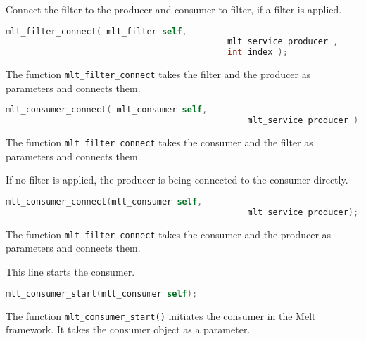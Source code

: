 \documentclass[../MasterThesis.tex]{subfiles}
\begin{document}
\begin{description}[font=\normalfont\color{RedViolet!80!black}, style=nextline]
	Connect the filter to the producer and consumer to filter, if a filter is applied.
	
	\begin{lstlisting}[language=C, numbers=none, basicstyle=\footnotesize\ttfamily, belowskip=0pt, aboveskip=9pt]
	mlt_filter_connect( mlt_filter self, 
											mlt_service producer , 
											int index ); \end{lstlisting}

	The function \texttt{mlt\_filter\_connect} takes the filter and the producer as parameters and connects them.
	
	\begin{lstlisting}[language=C, numbers=none, basicstyle=\footnotesize\ttfamily, belowskip=0pt, aboveskip=9pt]
	mlt_consumer_connect( mlt_consumer self, 
												mlt_service producer ); \end{lstlisting}

	The function \texttt{mlt\_filter\_connect} takes the consumer and the filter as parameters and connects them.
	
	
	If no filter is applied, the producer is being connected to the consumer directly.
	
	\begin{lstlisting}[language=C, numbers=none, basicstyle=\footnotesize\ttfamily, belowskip=0pt, aboveskip=9pt]
	mlt_consumer_connect(mlt_consumer self, 
												mlt_service producer); \end{lstlisting}
	
	The function \texttt{mlt\_filter\_connect} takes the consumer and the producer as parameters and connects them.
	
	
	\item[Start consumer] 
	
	This line starts the consumer.
	
	\begin{lstlisting}[language=C, numbers=none, basicstyle=\footnotesize\ttfamily, belowskip=0pt, aboveskip=9pt]
	mlt_consumer_start(mlt_consumer self);	\end{lstlisting}

	The function \texttt{mlt\_consumer\_start()} initiates the consumer in the Melt framework. It takes the consumer object as a parameter. 
	
	
	
	
	
	\item[Close the components]
	

\end{description}
\end{document}
